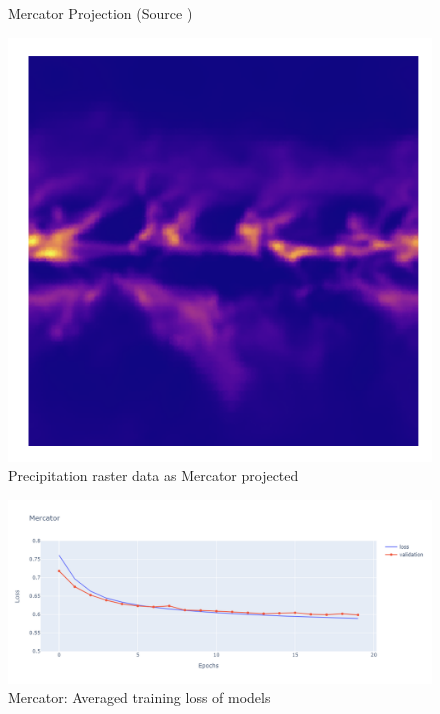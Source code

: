 \begin{figure}[h]
\begin{minipage}{0.30\textwidth}
        \caption{Mercator Projection (Source \cite{PROJ_SITE})}
        \label{fig:merc_proj}
    \end{minipage}\hfill
    \begin{minipage}{0.30\textwidth}
        \centering
        \includegraphics[width=0.9\linewidth]{figures/chapter-8/prect_mercator.png}
        \caption{Precipitation raster data as Mercator projected}
        \label{fig:merc_prect_raster}
    \end{minipage}\hfill
\end{figure}

\begin{figure}[h]
    \centering
    \includegraphics[width=1.0\linewidth]{figures/chapter-8/merc_loss.png}
    \caption{Mercator: Averaged training loss of models  }
    \label{fig:merc_loss}
\end{figure}


